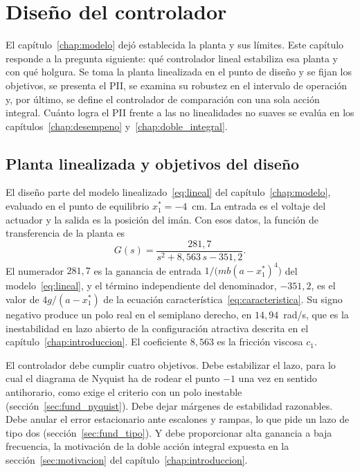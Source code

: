 \chapter{Diseño del controlador}\label{chap:controlador}

El capítulo~\ref{chap:modelo} dejó establecida la planta y sus límites. Este capítulo responde a la pregunta siguiente: qué controlador lineal estabiliza esa planta y con qué holgura. Se toma la planta linealizada en el punto de diseño y se fijan los objetivos, se presenta el PII, se examina su robustez en el intervalo de operación y, por último, se define el controlador de comparación con una sola acción integral. Cuánto logra el PII frente a las no linealidades no suaves se evalúa en los capítulos~\ref{chap:desempeno} y~\ref{chap:doble_integral}.

\section{Planta linealizada y objetivos del diseño}\label{sec:planta_diseno}

El diseño parte del modelo linealizado~\eqref{eq:lineal} del capítulo~\ref{chap:modelo}, evaluado en el punto de equilibrio $x_1^*=-4$~cm. La entrada es el voltaje del actuador y la salida es la posición del imán. Con esos datos, la función de transferencia de la planta es
\begin{equation}
G(s)=\frac{281{,}7}{s^{2}+8{,}563\,s-351{,}2} .
\label{eq:planta}
\end{equation}
El numerador $281{,}7$ es la ganancia de entrada $1/\bigl(mb(a-x_1^*)^4\bigr)$ del modelo~\eqref{eq:lineal}, y el término independiente del denominador, $-351{,}2$, es el valor de $4g/(a-x_1^*)$ de la ecuación característica~\eqref{eq:caracteristica}. Su signo negativo produce un polo real en el semiplano derecho, en $14{,}94$~rad/s, que es la inestabilidad en lazo abierto de la configuración atractiva descrita en el capítulo~\ref{chap:introduccion}. El coeficiente $8{,}563$ es la fricción viscosa $c_1$.

El controlador debe cumplir cuatro objetivos. Debe estabilizar el lazo, para lo cual el diagrama de Nyquist ha de rodear el punto $-1$ una vez en sentido antihorario, como exige el criterio con un polo inestable (sección~\ref{sec:fund_nyquist}). Debe dejar márgenes de estabilidad razonables. Debe anular el error estacionario ante escalones y rampas, lo que pide un lazo de tipo dos (sección~\ref{sec:fund_tipo}). Y debe proporcionar alta ganancia a baja frecuencia, la motivación de la doble acción integral expuesta en la sección~\ref{sec:motivacion} del capítulo~\ref{chap:introduccion}.

